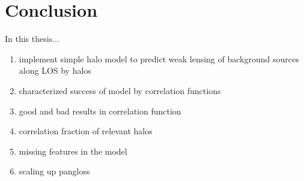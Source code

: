 \documentclass[%
 reprint,
 amsmath,amssymb,
 aps,nofootinbib
]{revtex4-1}
\begin{document}
\section{Conclusion} \label{conclusion}

In this thesis...
\begin{enumerate}
\item implement simple halo model to predict weak lensing of background sources along LOS by halos
\item characterized success of model by correlation functions
\item good and bad results in correlation function
\item correlation fraction of relevant halos
\item missing features in the model
\item scaling up pangloss
\end{enumerate}

\end{document}
